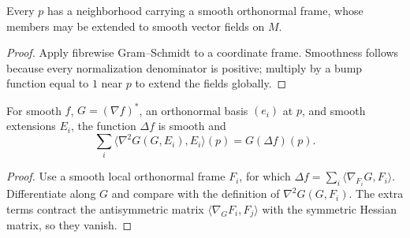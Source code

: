 \begin{lemma}
\label{lem:local-orthonormal-frame}
\leanok



Every $p$ has a neighborhood carrying a smooth orthonormal frame,
whose members may be extended to smooth vector fields on $M$.
\end{lemma}
\begin{proof}
\sketch
{}
\leanok
Apply fibrewise Gram--Schmidt to a coordinate frame. Smoothness follows
because every normalization denominator is positive; multiply by a
bump function equal to $1$ near $p$ to extend the fields globally.
\end{proof}

\begin{lemma}
\label{lem:laplacian-trace-commutation}
\leanok



For smooth $f$, $G=(\nabla f)^*$, an orthonormal basis $(e_i)$ at $p$,
and smooth extensions $E_i$, the function $\Delta f$ is smooth and
$$\sum_i\langle\nabla^2G(G,E_i),E_i\rangle(p)=G(\Delta f)(p).$$
\end{lemma}
\begin{proof}
\sketch
{}
\leanok
Use a smooth local orthonormal frame $F_i$, for which
$\Delta f=\sum_i\langle\nabla_{F_i}G,F_i\rangle$. Differentiate along
$G$ and compare with the definition of $\nabla^2G(G,F_i)$. The extra
terms contract the antisymmetric matrix
$\langle\nabla_GF_i,F_j\rangle$ with the symmetric Hessian matrix, so
they vanish.
\end{proof}

